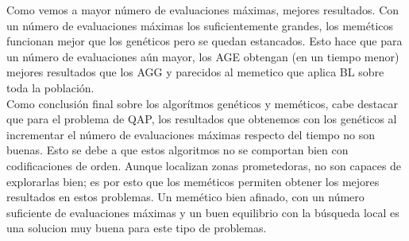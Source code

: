 \documentclass[a4paper, 12pt]{article}
\begin{document}
      Como vemos a mayor número de evaluaciones máximas, mejores resultados. Con un número de evaluaciones máximas los suficientemente grandes, los meméticos funcionan mejor que los genéticos pero se quedan estancados. Esto hace que para un número de evaluaciones aún mayor, los AGE obtengan (en un tiempo menor) mejores resultados que los AGG y parecidos al memetico que aplica BL sobre toda la población.\\
      
      Como conclusión final sobre los algorítmos genéticos y meméticos, cabe destacar que para el problema de QAP, los resultados que obtenemos con los genéticos al incrementar el número de evaluaciones máximas respecto del tiempo no son buenas. Esto se debe a que estos algoritmos no se comportan bien con codificaciones de orden. Aunque localizan zonas prometedoras, no son capaces de explorarlas bien; es por esto que los meméticos permiten obtener los mejores resultados en estos problemas. Un memético bien afinado, con un número suficiente de evaluaciones máximas y un buen equilibrio con la búsqueda local es una solucion muy buena para este tipo de problemas. 
      
      
	
	

	
      
      
      
   
\printindex
\end{document}
